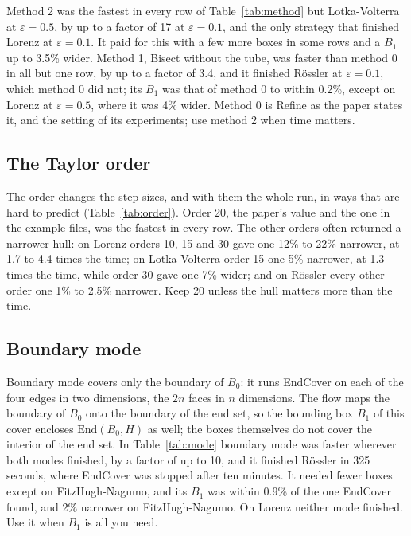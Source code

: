 \documentclass[11pt,a4paper]{article}
\newcommand{\eps}{\varepsilon}
\newcommand{\End}{\mathrm{End}}
\newcommand{\wmax}{w_{\max}}
\begin{document}
Method 2 was the fastest in every row of Table~\ref{tab:method} but
Lotka-Volterra at $\eps = 0.5$, by up to a factor of 17 at $\eps = 0.1$, and
the only strategy that finished Lorenz at $\eps = 0.1$. It paid for this
with a few more boxes in some rows and a $B_1$ up to 3.5\% wider. Method 1,
Bisect without the tube, was faster than method 0 in all but one row, by up
to a factor of 3.4, and it finished R\"ossler at $\eps = 0.1$, which method 0
did not; its $B_1$ was that of method 0 to within 0.2\%, except on Lorenz at
$\eps = 0.5$, where it was 4\% wider. Method 0 is Refine as the paper states it, and the setting of its
experiments; use method 2 when time matters.

\subsection{The Taylor order}

\begin{table}[htb]
\centering\small
\caption{The Taylor order of StepB: time and $\wmax(B_1)$.}
\label{tab:order}

\end{table}

The order changes the step sizes, and with them the whole run, in ways that
are hard to predict (Table~\ref{tab:order}). Order 20, the paper's value and
the one in the example files, was the fastest in every row. The other
orders often returned a narrower hull: on Lorenz orders 10, 15 and 30 gave
one 12\% to 22\% narrower, at 1.7 to 4.4 times the time; on Lotka-Volterra
order 15 one 5\% narrower, at 1.3 times the time, while order 30 gave one
7\% wider; and on R\"ossler every other order one 1\% to 2.5\% narrower. Keep
20 unless the hull matters more than the time.

\subsection{Boundary mode}

\begin{table}[htb]
\centering\small
\caption{EndCover (\texttt{mode=0}) and Boundary mode (\texttt{mode=1}) at
  $\eps = 0.1$.}
\label{tab:mode}

\end{table}

Boundary mode covers only the boundary of $B_0$: it runs EndCover on each of
the four edges in two dimensions, the $2n$ faces in $n$ dimensions. The flow
maps the boundary of $B_0$ onto the boundary of the end set, so the bounding
box $B_1$ of this cover encloses $\End(B_0,H)$ as well; the boxes themselves
do not cover the interior of the end set. In Table~\ref{tab:mode} boundary
mode was faster wherever both modes finished, by a factor of up to 10, and
it finished R\"ossler in 325 seconds, where EndCover was stopped after ten
minutes. It
needed fewer boxes except on FitzHugh-Nagumo, and its $B_1$ was within
0.9\% of the one EndCover found, and 2\% narrower on FitzHugh-Nagumo. On
Lorenz neither mode finished. Use it when $B_1$ is all you need.
\end{document}
